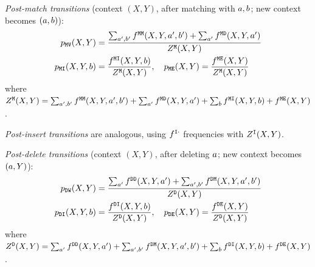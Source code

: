 \medskip
\noindent\emph{Post-match transitions} (context $(X,Y)$, after matching with $a,b$;
new context becomes $(a,b)$):
\begin{align*}
p_{{\tt M}{\tt V}}(X,Y) &= \frac{\sum_{a',b'} f^{{\tt M}{\tt M}}(X,Y,a',b') + \sum_{a'} f^{{\tt M}{\tt D}}(X,Y,a')}
  {Z^{{\tt M}}(X,Y)} \\
p_{{\tt M}{\tt I}}(X,Y,b) &= \frac{f^{{\tt M}{\tt I}}(X,Y,b)}{Z^{{\tt M}}(X,Y)}, \quad
p_{{\tt M}{\tt E}}(X,Y) = \frac{f^{{\tt M}{\tt E}}(X,Y)}{Z^{{\tt M}}(X,Y)}
\end{align*}
where $Z^{{\tt M}}(X,Y) = \sum_{a',b'} f^{{\tt M}{\tt M}}(X,Y,a',b') + \sum_{a'} f^{{\tt M}{\tt D}}(X,Y,a') + \sum_{b} f^{{\tt M}{\tt I}}(X,Y,b) + f^{{\tt M}{\tt E}}(X,Y)$.

\medskip
\noindent\emph{Post-insert transitions} are analogous, using $f^{{\tt I}\cdot}$ frequencies with $Z^{{\tt I}}(X,Y)$.

\medskip
\noindent\emph{Post-delete transitions} (context $(X,Y)$, after deleting $a$;
new context becomes $(a,Y)$):
\begin{align*}
p_{{\tt D}{\tt W}}(X,Y) &= \frac{\sum_{a'} f^{{\tt D}{\tt D}}(X,Y,a') + \sum_{a',b'} f^{{\tt D}{\tt M}}(X,Y,a',b')}
  {Z^{{\tt D}}(X,Y)} \\
p_{{\tt D}{\tt I}}(X,Y,b) &= \frac{f^{{\tt D}{\tt I}}(X,Y,b)}{Z^{{\tt D}}(X,Y)}, \quad
p_{{\tt D}{\tt E}}(X,Y) = \frac{f^{{\tt D}{\tt E}}(X,Y)}{Z^{{\tt D}}(X,Y)}
\end{align*}
where $Z^{{\tt D}}(X,Y) = \sum_{a'} f^{{\tt D}{\tt D}}(X,Y,a') + \sum_{a',b'} f^{{\tt D}{\tt M}}(X,Y,a',b') + \sum_{b} f^{{\tt D}{\tt I}}(X,Y,b) + f^{{\tt D}{\tt E}}(X,Y)$.
